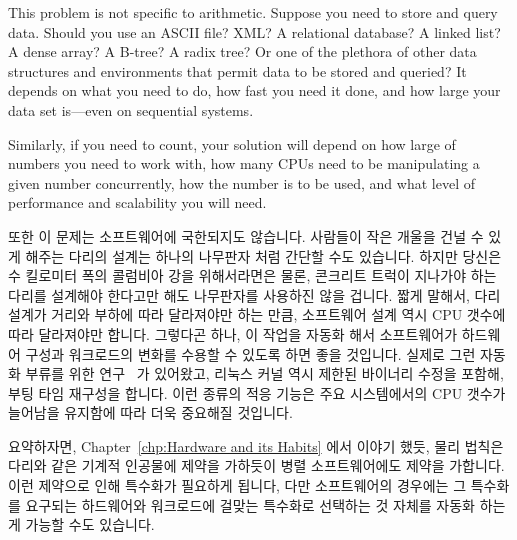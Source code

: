 This problem is not specific to arithmetic.
Suppose you need to store and query data.
Should you use an ASCII file? 
XML?
A relational database?
A linked list?
A dense array?
A B-tree?
A radix tree?
Or one of the plethora of other data
structures and environments that permit data to be stored and queried?
It depends on what you need to do, how fast you need it done, and how
large your data set is---even on sequential systems.

Similarly, if you need to count, your solution will depend on how large
of numbers you need to work with, how many CPUs need to be manipulating
a given number concurrently, how the number is to be used, and what
level of performance and scalability you will need.
\fi

또한 이 문제는 소프트웨어에 국한되지도 않습니다.
사람들이 작은 개울을 건널 수 있게 해주는 다리의 설계는 하나의 나무판자 처럼
간단할 수도 있습니다.
하지만 당신은 수 킬로미터 폭의 콜럼비아 강을 위해서라면은 물론, 콘크리트 트럭이
지나가야 하는 다리를 설계해야 한다고만 해도 나무판자를 사용하진 않을 겁니다.
짧게 말해서, 다리 설계가 거리와 부하에 따라 달라져야만 하는 만큼, 소프트웨어
설계 역시 CPU 갯수에 따라 달라져야만 합니다.
그렇다곤 하나, 이 작업을 자동화 해서 소프트웨어가 하드웨어 구성과 워크로드의
변화를 수용할 수 있도록 하면 좋을 것입니다.
실제로 그런 자동화 부류를 위한 연구~\cite{Appavoo03a,Soules03a} 가 있어왔고,
리눅스 커널 역시 제한된 바이너리 수정을 포함해, 부팅 타임 재구성을 합니다.
이런 종류의 적응 기능은 주요 시스템에서의 CPU 갯수가 늘어남을 유지함에 따라
더욱 중요해질 것입니다.

요약하자면, Chapter~\ref{chp:Hardware and its Habits} 에서 이야기 했듯, 물리
법칙은 다리와 같은 기계적 인공물에 제약을 가하듯이 병렬 소프트웨어에도 제약을
가합니다.
이런 제약으로 인해 특수화가 필요하게 됩니다, 다만 소프트웨어의 경우에는 그
특수화를 요구되는 하드웨어와 워크로드에 걸맞는 특수화로 선택하는 것 자체를
자동화 하는게 가능할 수도 있습니다.

